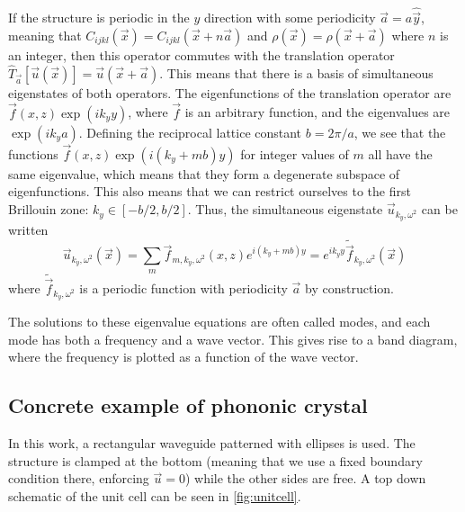 If the structure is periodic in the $y$ direction with some periodicity
$\vec a = a \hat{\vec y}$,
meaning that $C_{ijkl}(\vec x) = C_{ijkl}(\vec x + n \vec a)$ and $\rho(\vec x)
= \rho(\vec x + \vec a)$ where $n$ is an
integer, then this operator commutes with the translation operator
$\hat T_{\vec a}[\vec u(\vec x)] = \vec u(\vec x + \vec a)$.
This means that there is a basis of simultaneous eigenstates of both operators.
The eigenfunctions of the translation operator are
$\vec f(x, z)\exp(i k_y y)$, where $\vec f$ is an arbitrary function,
and the eigenvalues are $\exp(i k_y a)$.
Defining the reciprocal lattice constant $b = 2 \pi / a$, we see
that the functions $\vec f(x, z) \exp(i (k_y + m b) y)$ for integer values
of $m$ all have the same eigenvalue, which means that they form a degenerate
subspace of eigenfunctions.
This also means that we can restrict ourselves to the first Brillouin zone:
$k_y \in [-b/2, b/2]$.
Thus, the simultaneous eigenstate $\vec u_{k_y, \omega^2}$ can be written
\begin{equation}
	\vec u_{k_y, \omega^2}(\vec x) = \sum_m \vec f_{m,k_y,\omega^2}(x, z) e^{i (k_y + m b) y}
	= e^{i k_y y} \tilde{\vec f}_{k_y, \omega^2}(\vec x)
\end{equation}
where $\tilde{\vec f}_{k_y, \omega^2}$ is a periodic function with periodicity
$\vec a$ by construction.

The solutions to these eigenvalue equations are often called modes, and each
mode has both a frequency and a wave vector. This gives rise to a band diagram,
where the frequency is plotted as a function of the wave vector.

\subsection{Concrete example of phononic crystal}

In this work, a rectangular waveguide patterned with ellipses is used.
The structure is clamped at the bottom (meaning that we use a fixed boundary
condition there, enforcing $\vec u = 0$) while the other sides are free.
A top down schematic of the unit cell can be seen in \cref{fig:unitcell}.

